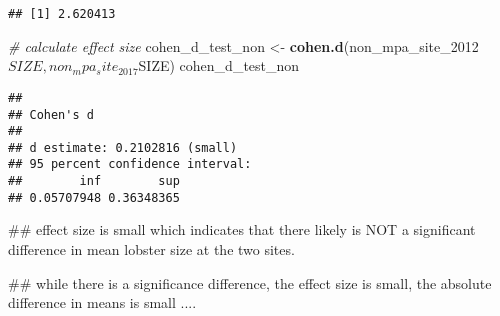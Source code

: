 \documentclass[]{article}
\newenvironment{Shaded}{\begin{snugshade}}{\end{snugshade}}
\newcommand{\KeywordTok}[1]{\textcolor[rgb]{0.13,0.29,0.53}{\textbf{{#1}}}}
\newcommand{\DecValTok}[1]{\textcolor[rgb]{0.00,0.00,0.81}{{#1}}}
\newcommand{\StringTok}[1]{\textcolor[rgb]{0.31,0.60,0.02}{{#1}}}
\newcommand{\CommentTok}[1]{\textcolor[rgb]{0.56,0.35,0.01}{\textit{{#1}}}}
\newcommand{\NormalTok}[1]{{#1}}
\begin{document}
\begin{Shaded}
\end{Shaded}

\begin{verbatim}
## [1] 2.620413
\end{verbatim}

\begin{Shaded}
\begin{Highlighting}[]
\CommentTok{# calculate effect size}
\NormalTok{cohen_d_test_non <-}\StringTok{ }\KeywordTok{cohen.d}\NormalTok{(non_mpa_site_2012$SIZE, non_mpa_site_2017$SIZE)}
\NormalTok{cohen_d_test_non}
\end{Highlighting}
\end{Shaded}

\begin{verbatim}
## 
## Cohen's d
## 
## d estimate: 0.2102816 (small)
## 95 percent confidence interval:
##        inf        sup 
## 0.05707948 0.36348365
\end{verbatim}

\begin{Shaded}
\begin{Highlighting}[]
\NormalTok{## effect size is small which indicates that there likely is NOT a significant difference in mean lobster size at the two sites.}

\NormalTok{## while there is a significance difference, the effect size is small, the absolute difference in means is small ....}
\end{Highlighting}
\end{Shaded}
\end{document}
